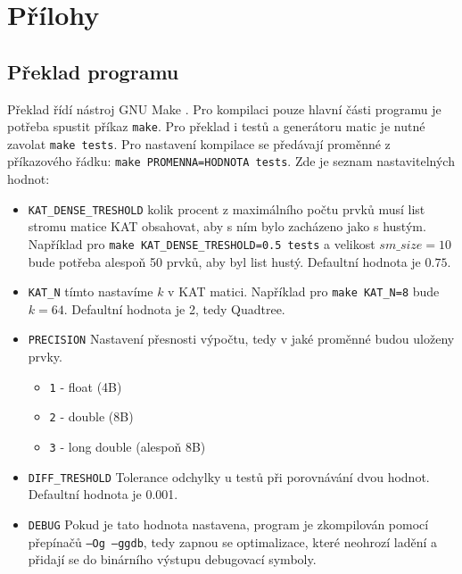 \documentclass[thesis=B,czech]{FITthesis}[2012/06/26]
\begin{document}



\appendix

\chapter{Přílohy}

\section{Překlad programu}

Překlad řídí nástroj GNU Make \cite{make}. Pro kompilaci pouze hlavní části programu je potřeba spustit příkaz \texttt{make}. Pro překlad i testů a generátoru matic je nutné zavolat \texttt{make tests}. Pro nastavení kompilace se předávají proměnné z příkazového řádku: \texttt{make PROMENNA=HODNOTA tests}. Zde je seznam nastavitelných hodnot:


\begin{itemize}
	\item \texttt{KAT\_DENSE\_TRESHOLD} kolik procent z maximálního počtu prvků musí list stromu matice KAT obsahovat, aby s ním bylo zacházeno jako s hustým. Například pro \texttt{make KAT\_DENSE\_TRESHOLD=0.5 tests} a velikost $sm\_size = 10$ bude potřeba alespoň 50 prvků, aby byl list hustý. Defaultní hodnota je $0.75$.
	\item \texttt{KAT\_N} tímto nastavíme $k$ v KAT matici. Například pro \texttt{make KAT\_N=8} bude $k=64$. Defaultní hodnota je 2, tedy Quadtree.

	\item \texttt{PRECISION} Nastavení přesnosti výpočtu, tedy v jaké proměnné budou uloženy prvky.
	\begin{itemize}
		\item \texttt{1} - float (4B)
		\item \texttt{2} - double (8B)
		\item \texttt{3} - long double (alespoň 8B)
	\end{itemize}
	
	\item \texttt{DIFF\_TRESHOLD} Tolerance odchylky u testů při porovnávání dvou hodnot. Defaultní hodnota je 0.001.
	
	\item \texttt{DEBUG} Pokud je tato hodnota nastavena, program je zkompilován pomocí přepínačů \texttt{--Og --ggdb}, tedy zapnou se optimalizace, které neohrozí ladění a přidají se do binárního výstupu debugovací symboly.
\end{itemize}
\end{document}
